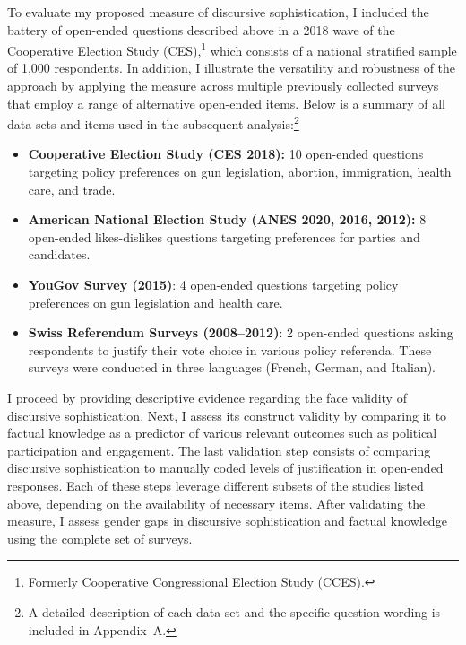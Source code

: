 To evaluate my proposed measure of discursive sophistication, I included the battery of open-ended questions described above in a 2018 wave of the Cooperative Election Study (CES),\footnote{Formerly Cooperative Congressional Election Study (CCES).} which consists of a national stratified sample of 1,000 respondents. In addition, I illustrate the versatility and robustness of the approach by applying the measure across multiple previously collected surveys that employ a range of alternative open-ended items. Below is a summary of all data sets and items used in the subsequent analysis:\footnote{A detailed description of each data set and the specific question wording is included in Appendix~A.}

\begin{itemize}\singlespacing
	\item \textbf{Cooperative Election Study (CES 2018):} 10 open-ended questions targeting policy preferences on gun legislation, abortion, immigration, health care, and trade.
	\item \textbf{American National Election Study (ANES 2020, 2016, 2012):} 8 open-ended likes-dislikes questions targeting preferences for parties and candidates.
	\item \textbf{YouGov Survey (2015)}: 4 open-ended questions targeting policy preferences on gun legislation and health care.
	\item \textbf{Swiss Referendum Surveys (2008--2012)}: 2 open-ended questions asking respondents to justify their vote choice in various policy referenda. These surveys were conducted in three languages (French, German, and Italian).
\end{itemize}


I proceed by providing descriptive evidence regarding the face validity of discursive sophistication. Next, I assess its construct validity by comparing it to factual knowledge as a predictor of various relevant outcomes such as political participation and engagement. The last validation step consists of comparing discursive sophistication to manually coded levels of justification in open-ended responses. Each of these steps leverage different subsets of the studies listed above, depending on the availability of necessary items. After validating the measure, I assess gender gaps in discursive sophistication and factual knowledge using the complete set of surveys.


